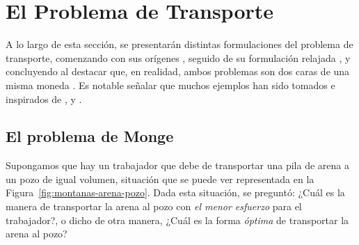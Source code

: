 {{		%


	}

	\section{El Problema de Transporte}\label{sec:el-problema-de-transporte}
	{
		A lo largo de esta sección, se presentarán distintas formulaciones del problema de transporte, comenzando con sus orígenes \cite{monge1781memoire}, seguido de su formulación relajada \cite{kantorovich1942translocation}, y concluyendo al destacar que, en realidad, ambos problemas son dos caras de una misma moneda \cite{brenier1991polar}. Es notable señalar que muchos ejemplos han sido tomados e inspirados de \cite{panaretos2020invitation}, \cite{peyre2019computational} y \cite{cuturi2017primer}.


		\subsection*{El problema de Monge}
		{


			Supongamos que hay un trabajador que debe de transportar una pila de arena a un pozo de igual volumen, situación que se puede ver representada en la Figura~\ref{fig:montanas-arena-pozo}. Dada esta situación, \cite{monge1781memoire} se preguntó: ¿Cuál es la manera de transportar la arena al pozo con \emph{el menor esfuerzo} para el trabajador?, o dicho de otra manera, ¿Cuál es la forma \emph{óptima} de transportar la arena al pozo?

}}}
